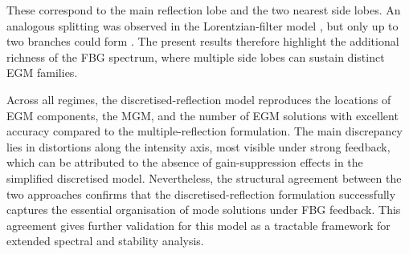 These correspond to the main reflection lobe and the two nearest side lobes. 
An analogous splitting was observed in the Lorentzian-filter model \cite{yousefi1999dynamical}, but only up to two branches could form \cite{green2006mode}. 
The present results therefore highlight the additional richness of the FBG spectrum, where multiple side lobes can sustain distinct EGM families. 
%
\par
%
Across all regimes, the discretised-reflection model reproduces the locations of EGM components, the MGM, and the number of EGM solutions with excellent accuracy compared to the multiple-reflection formulation. 
The main discrepancy lies in distortions along the intensity axis, most visible under strong feedback, which can be attributed to the absence of gain-suppression effects in the simplified discretised model. 
Nevertheless, the structural agreement between the two approaches confirms that the discretised-reflection formulation successfully captures the essential organisation of mode solutions under FBG feedback. 
This agreement gives further validation for this model as a tractable framework for extended spectral and stability analysis.
%
